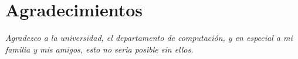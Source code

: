 

\chapter*{Agradecimientos}
{\sl Agradezco a la universidad, el departamento de computación, y en especial a mi familia y mis amigos, esto no seria posible sin ellos.}

